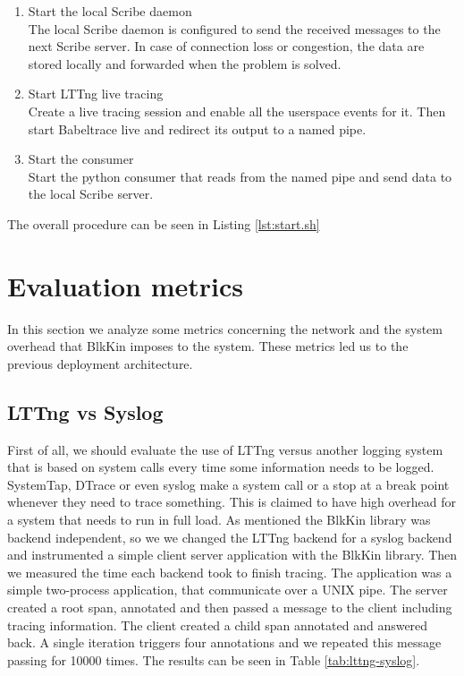 \begin{enumerate}
\item Start the local Scribe daemon \\ 
    The local Scribe daemon is configured to send the received messages to the
    next Scribe server. In case of connection loss or congestion, the data are
    stored locally and forwarded when the problem is solved.

\item Start LTTng live tracing \\
    Create a live tracing session and enable all the userspace events for it.
    Then start Babeltrace live and redirect its output to a named pipe.

\item Start the consumer \\
    Start the python consumer that reads from the named pipe and send data to
    the local Scribe server.  
\end{enumerate}

The overall procedure can be seen in Listing \ref{lst:start.sh}

\section{Evaluation metrics}\label{sec:metrics}

In this section we analyze some metrics concerning the network and the system
overhead that BlkKin imposes to the system. These metrics led us to the previous
deployment architecture.

\subsection{LTTng vs Syslog}
First of all, we should evaluate the use of LTTng versus another logging system
that is based on system calls every time some information needs to be logged.
SystemTap, DTrace or even syslog make a system call or a stop at a break point
whenever they need to trace something. This is claimed to have high overhead for
a system that needs to run in full load. As mentioned the BlkKin library was
backend independent, so we we changed the LTTng backend for a syslog backend and
instrumented a simple client server application with the BlkKin library. Then we
measured the time each backend took to finish tracing. The application was a
simple two-process application, that communicate over a UNIX pipe. The server
created a root span, annotated and then passed a message to the client including
tracing information. The client created a child span annotated and answered
back. A single iteration triggers four annotations and we repeated this message
passing for 10000 times. The results can be seen in Table
\ref{tab:lttng-syslog}. 

